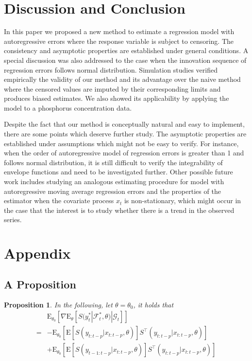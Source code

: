 \documentclass[a4paper,12pt]{article}
\newcommand{\E}{\mathop{\mathbb{E}}}
\def \trans{^\intercal}
\def \E{\mbox{E}}
\def \F {\mathcal{F}}
\def \G {\mathcal{G}}
\newtheorem{proposition}[theorem]{Proposition}
\begin{document}
\section{Discussion and Conclusion}
\label{conclusion}
In this paper we proposed a new method to estimate a regression model with autoregressive errors where the response variable is subject to censoring. The consistency and asymptotic properties are established under general conditions. A special discussion was also addressed to the case when the innovation sequence of regression errors follows normal distribution. Simulation studies verified empirically the validity of our method and its advantage over the naive method where the censored values are imputed by their corresponding limits and produces biased estimates. We also showed its applicability by applying the model to a phosphorus concentration data.

Despite the fact that our method is conceptually natural and easy to implement, there are some points which deserve further study. The asymptotic properties are established under assumptions which might not be easy to verify. For instance, when the order of autoregressive model of regression errors is greater than 1 and follows normal distribution, it is still difficult to verify the integrability of envelope functions and need to be investigated further. Other possible future work includes studying an analogous estimating procedure for model with autoregressive moving average regression errors and the properties of the estimator when the covariate process $x_t$ is non-stationary, which might occur in the case that the interest is to study whether there is a trend in the observed series.

\section{Appendix}
\label{appen}

\subsection{A Proposition}
\begin{proposition}
\label{prop:m1}
In the following, let $\theta = \theta_0$, it holds that 
\begin{align*}
&\E_{\theta_0}\left[ \nabla \E_\theta\left[S(y_t^*|\F_t^*,\theta) | \G_t\right] \right]\\
=&-\E_{\theta_0}\left[ \E\left[S(y_{t:t-p}|x_{t:t-p},\theta)\right]S\trans(y_{t:t-p}|x_{t:t-p},\theta)\right]\\
&+\E_{\theta_0}\left[ \E\left[S(y_{t-1:t-p}|x_{t:t-p},\theta) \right]S\trans(y_{t:t-p}|x_{t:t-p},\theta)\right]\\
\end{align*}
\end{proposition} 
\end{document}
